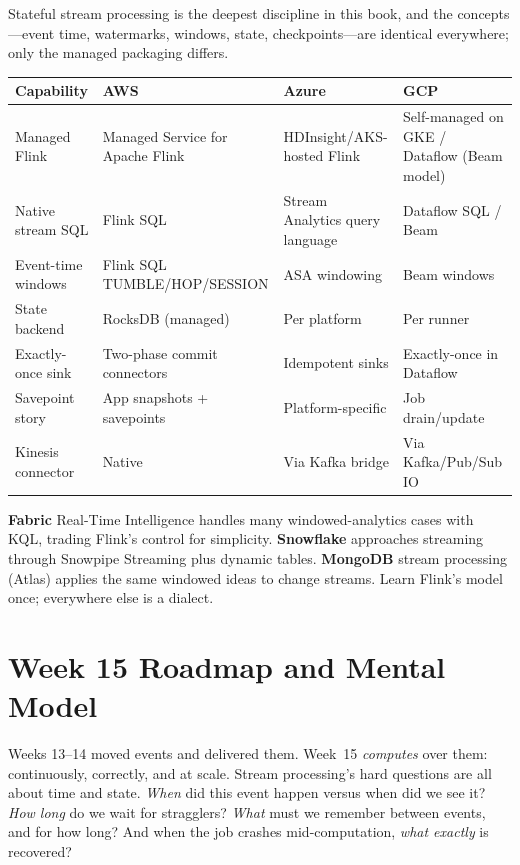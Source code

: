 \begin{crosscloud}
Stateful stream processing is the deepest discipline in this book, and the concepts---event time, watermarks, windows, state, checkpoints---are identical everywhere; only the managed packaging differs.

\vspace{2mm}
{\footnotesize
\begin{tabular}{@{}p{2.8cm}p{3.0cm}p{3.0cm}p{3.0cm}@{}}
\toprule
\textbf{Capability} & \textbf{AWS} & \textbf{Azure} & \textbf{GCP} \\
\midrule
Managed Flink & Managed Service for Apache Flink & HDInsight/AKS-hosted Flink & Self-managed on GKE / Dataflow (Beam model) \\
Native stream SQL & Flink SQL & Stream Analytics query language & Dataflow SQL / Beam \\
Event-time windows & Flink SQL TUMBLE/HOP/SESSION & ASA windowing & Beam windows \\
State backend & RocksDB (managed) & Per platform & Per runner \\
Exactly-once sink & Two-phase commit connectors & Idempotent sinks & Exactly-once in Dataflow \\
\addlinespace
Savepoint story & App snapshots + savepoints & Platform-specific & Job drain/update \\
Kinesis connector & Native & Via Kafka bridge & Via Kafka/Pub/Sub IO \\
\bottomrule
\end{tabular}}

\vspace{1mm}
\textbf{Fabric} Real-Time Intelligence handles many windowed-analytics cases with KQL, trading Flink's control for simplicity. \textbf{Snowflake} approaches streaming through Snowpipe Streaming plus dynamic tables. \textbf{MongoDB} stream processing (Atlas) applies the same windowed ideas to change streams. Learn Flink's model once; everywhere else is a dialect.
\end{crosscloud}

\section{Week 15 Roadmap and Mental Model}
Weeks 13--14 moved events and delivered them. Week~15 \emph{computes} over them: continuously, correctly, and at scale. Stream processing's hard questions are all about time and state. \emph{When} did this event happen versus when did we see it? \emph{How long} do we wait for stragglers? \emph{What} must we remember between events, and for how long? And when the job crashes mid-computation, \emph{what exactly} is recovered?

